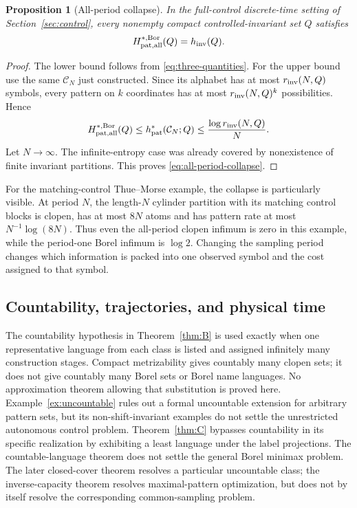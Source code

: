 \documentclass[11pt,reqno]{amsart}
\numberwithin{equation}{section}
\newtheorem{proposition}[theorem]{Proposition}
\theoremstyle{definition}
\newcommand{\C}{\mathcal C}
\newcommand{\hpat}{h_{\mathrm{pat}}^{*}}
\newcommand{\hinv}{h_{\mathrm{inv}}}
\newcommand{\Bor}{\mathrm{Bor}}
\begin{document}
\begin{proposition}[All-period collapse]\label{prop:all-period-collapse}
In the full-control discrete-time setting of Section~\ref{sec:control}, every
nonempty compact controlled-invariant set $Q$ satisfies
\begin{equation}\label{eq:all-period-collapse}
 H_{\rm pat,all}^{*,\Bor}(Q)=\hinv(Q).
\end{equation}
\end{proposition}

\begin{proof}
The lower bound follows from
\eqref{eq:three-quantities}. For the upper bound use the same
$\C_N$ just constructed. Since its alphabet has at most
$r_{\rm inv}(N,Q)$ symbols, every pattern on $k$ coordinates has at most
$r_{\rm inv}(N,Q)^k$ possibilities. Hence
\begin{align*}
 H_{\rm pat,all}^{*,\Bor}(Q)
 \le\hpat(\C_N;Q)
 \le\frac{\log r_{\rm inv}(N,Q)}{N}.
\end{align*}
Let $N\to\infty$. The infinite-entropy case was already covered by
nonexistence of finite invariant partitions. This proves
\eqref{eq:all-period-collapse}.
\end{proof}

For the matching-control Thue--Morse example, the collapse is particularly
visible. At period $N$, the length-$N$ cylinder partition with its matching
control blocks is clopen, has at most $8N$ atoms and has pattern rate at
most $N^{-1}\log(8N)$. Thus even the all-period clopen infimum is zero
in this example, while the period-one Borel infimum is $\log2$.
Changing the sampling period changes which information is packed into
one observed symbol and the cost assigned to that symbol.

\subsection{Countability, trajectories, and physical time}
The countability hypothesis in Theorem~\ref{thm:B} is used exactly when
one representative language from each class is listed and assigned
infinitely many construction stages. Compact metrizability gives
countably many clopen sets; it does not give countably many Borel sets
or Borel name languages. No approximation theorem allowing that
substitution is proved here. Example~\ref{ex:uncountable} rules out a
formal uncountable extension for arbitrary pattern sets, but its
non-shift-invariant examples do not settle the unrestricted autonomous
control problem. Theorem~\ref{thm:C} bypasses countability in its specific
realization by exhibiting a least language under the label projections.
The countable-language theorem does not settle the general Borel minimax
problem. The later closed-cover theorem resolves a particular uncountable
class; the inverse-capacity theorem resolves maximal-pattern optimization,
but does not by itself resolve the corresponding common-sampling problem.
\end{document}
